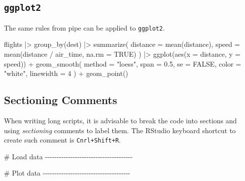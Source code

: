 \documentclass[
  letterpaper,
  DIV=11,
  numbers=noendperiod]{scrreprt}
\newenvironment{Shaded}{\begin{snugshade}}{\end{snugshade}}
\newcommand{\AttributeTok}[1]{\textcolor[rgb]{0.40,0.45,0.13}{#1}}
\newcommand{\CommentTok}[1]{\textcolor[rgb]{0.37,0.37,0.37}{#1}}
\newcommand{\ConstantTok}[1]{\textcolor[rgb]{0.56,0.35,0.01}{#1}}
\newcommand{\DecValTok}[1]{\textcolor[rgb]{0.68,0.00,0.00}{#1}}
\newcommand{\FloatTok}[1]{\textcolor[rgb]{0.68,0.00,0.00}{#1}}
\newcommand{\FunctionTok}[1]{\textcolor[rgb]{0.28,0.35,0.67}{#1}}
\newcommand{\NormalTok}[1]{\textcolor[rgb]{0.00,0.23,0.31}{#1}}
\newcommand{\SpecialCharTok}[1]{\textcolor[rgb]{0.37,0.37,0.37}{#1}}
\newcommand{\StringTok}[1]{\textcolor[rgb]{0.13,0.47,0.30}{#1}}
\begin{document}
\subsection{\texorpdfstring{\texttt{ggplot2}}{ggplot2}}\label{ggplot2}

The same rules from pipe can be applied to \texttt{ggplot2}.

\begin{Shaded}
\begin{Highlighting}[]
\NormalTok{flights }\SpecialCharTok{|\textgreater{}} 
  \FunctionTok{group\_by}\NormalTok{(dest) }\SpecialCharTok{|\textgreater{}} 
  \FunctionTok{summarize}\NormalTok{(}
    \AttributeTok{distance =} \FunctionTok{mean}\NormalTok{(distance),}
    \AttributeTok{speed =} \FunctionTok{mean}\NormalTok{(distance }\SpecialCharTok{/}\NormalTok{ air\_time, }\AttributeTok{na.rm =} \ConstantTok{TRUE}\NormalTok{)}
\NormalTok{  ) }\SpecialCharTok{|\textgreater{}} 
  \FunctionTok{ggplot}\NormalTok{(}\FunctionTok{aes}\NormalTok{(}\AttributeTok{x =}\NormalTok{ distance, }\AttributeTok{y =}\NormalTok{ speed)) }\SpecialCharTok{+}
  \FunctionTok{geom\_smooth}\NormalTok{(}
    \AttributeTok{method =} \StringTok{"loess"}\NormalTok{,}
    \AttributeTok{span =} \FloatTok{0.5}\NormalTok{,}
    \AttributeTok{se =} \ConstantTok{FALSE}\NormalTok{, }
    \AttributeTok{color =} \StringTok{"white"}\NormalTok{, }
    \AttributeTok{linewidth =} \DecValTok{4}
\NormalTok{  ) }\SpecialCharTok{+}
  \FunctionTok{geom\_point}\NormalTok{()}
\end{Highlighting}
\end{Shaded}

\subsection{Sectioning Comments}\label{sectioning-comments}

When writing long scripts, it is advisable to break the code into
sections and using \emph{sectioning} comments to label them. The RStudio
keyboard shortcut to create such comment is \texttt{Cnrl+Shift+R}.

\begin{Shaded}
\begin{Highlighting}[]
\CommentTok{\# Load data {-}{-}{-}{-}{-}{-}{-}{-}{-}{-}{-}{-}{-}{-}{-}{-}{-}{-}{-}{-}{-}{-}{-}{-}{-}{-}{-}{-}{-}{-}{-}{-}{-}{-}{-}{-}{-}{-}}

\CommentTok{\# Plot data {-}{-}{-}{-}{-}{-}{-}{-}{-}{-}{-}{-}{-}{-}{-}{-}{-}{-}{-}{-}{-}{-}{-}{-}{-}{-}{-}{-}{-}{-}{-}{-}{-}{-}{-}{-}{-}{-}}
\end{Highlighting}
\end{Shaded}
\end{document}
